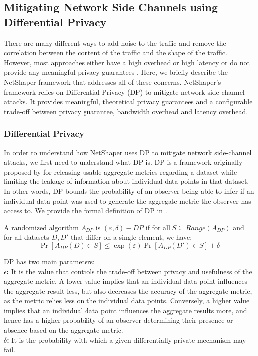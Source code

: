 \subsection{Mitigating Network Side Channels using Differential Privacy}
\label{subsec:netshaper-background-framework}

There are many different ways to add noise to the traffic and remove the correlation between the content of the traffic and the shape of the traffic.
However, most approaches either have a high overhead or high latency \cite{cai2014csbuflo, mehta2022pacer} or do not provide any meaningful privacy guarantees \cite{hou2020wf, nasr2021blind, rahman2020mockingbird, shan2021dolos, wang2017walkie, wright2009traffic}.
Here, we briefly describe the NetShaper framework that addresses all of these concerns.
NetShaper's framework relies on Differential Privacy (DP) to mitigate network side-channel attacks.
It provides meaningful, theoretical privacy guarantees and a configurable trade-off between privacy guarantee, bandwidth overhead and latency overhead.

\subsubsection{Differential Privacy}
\label{subsubsec:netshaper-background-framework-dp}
In order to understand how NetShaper uses DP to mitigate network side-channel attacks, we first need to understand what DP is.
DP is a framework originally proposed by \citet{dwork2006differential} for releasing usable aggregate metrics regarding a dataset while limiting the leakage of information about individual data points in that dataset.
In other words, DP bounds the probability of an observer being able to infer if an individual data point was used to generate the aggregate metric the observer has access to.
We provide the formal definition of DP in . 

\begin{definition}
  \label{def:dp}
  A randomized algorithm $A_{DP}$ is $(\varepsilon, \delta)-DP$ if for all ${S} \subseteq Range(A_{DP})$ and for all datasets $D, D'$ that differ on a single element, we have:
  \begin{equation*}
    \Pr[A_{DP}(D) \in S] \leq \exp(\varepsilon)\Pr[A_{DP}(D') \in S] + \delta
  \end{equation*}
\end{definition}

DP has two main parameters: \\
\textbf{$\epsilon$: } It is the value that controls the trade-off between privacy and usefulness of the aggregate metric.
A lower value implies that an individual data point influences the aggregate result less, but also decreases the accuracy of the aggregate metric, as the metric relies less on the individual data points.
Conversely, a higher value implies that an individual data point influences the aggregate results more, and hence has a higher probability of an observer determining their presence or absence based on the aggregate metric.\\
\textbf{$\delta$: } It is the probability with which a given differentially-private mechanism may fail.


